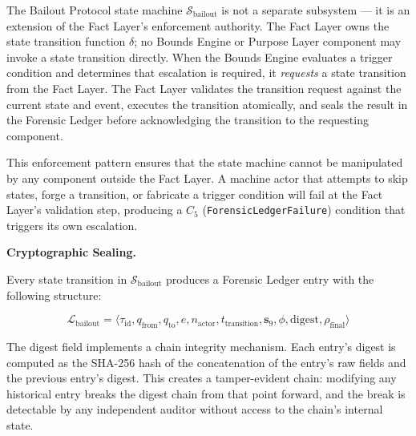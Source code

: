 The Bailout Protocol state machine $\mathcal{S}_{\text{bailout}}$ is not a separate
subsystem — it is an extension of the Fact Layer's enforcement authority. The Fact
Layer owns the state transition function $\delta$; no Bounds Engine or Purpose Layer
component may invoke a state transition directly. When the Bounds Engine evaluates a
trigger condition and determines that escalation is required, it \emph{requests} a state
transition from the Fact Layer. The Fact Layer validates the transition request against
the current state and event, executes the transition atomically, and seals the result
in the Forensic Ledger before acknowledging the transition to the requesting component.

This enforcement pattern ensures that the state machine cannot be manipulated by
any component outside the Fact Layer. A machine actor that attempts to skip states,
forge a transition, or fabricate a trigger condition will fail at the Fact Layer's
validation step, producing a $C_5$ (\texttt{ForensicLedgerFailure}) condition that
triggers its own escalation.

\bigskip

\noindent\textbf{Cryptographic Sealing.}

Every state transition in $\mathcal{S}_{\text{bailout}}$ produces a Forensic Ledger
entry with the following structure:

\begin{equation}
\mathcal{L}_{\text{bailout}} = \bigl\langle
  \tau_{\text{id}},           %
  q_{\text{from}},            %
  q_{\text{to}},              %
  e,                          %
  n_{\text{actor}},           %
  t_{\text{transition}},      %
  \mathbf{s}_9,              %
  \phi,                       %
  \text{digest},             %
  \rho_{\text{final}}         %
\bigr\rangle
\end{equation}

The digest field implements a chain integrity mechanism. Each entry's digest is computed
as the SHA-256 hash of the concatenation of the entry's raw fields and the previous
entry's digest. This creates a tamper-evident chain: modifying any historical entry
breaks the digest chain from that point forward, and the break is detectable by any
independent auditor without access to the chain's internal state.

